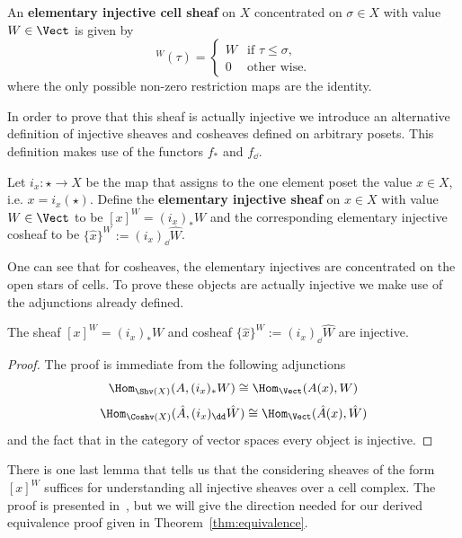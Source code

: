 \begin{defn}
 An \textbf{elementary injective cell sheaf} on $X$ concentrated on $\sigma\in X$ with value $W\in\Vect$ is given by
\begin{equation*}
[\sigma]^W(\tau)=
\begin{cases}
W & \text{if } \tau\leq \sigma,\\
0 & \text{other wise.}
\end{cases}
\end{equation*}
where the only possible non-zero restriction maps are the identity.
\end{defn}

In order to prove that this sheaf is actually injective we introduce an alternative definition of injective sheaves and cosheaves defined on arbitrary posets. This definition makes use of the functors $f_*$ and $f_{\dd}$.

\begin{defn}
 Let $i_x:\star \to X$ be the map that assigns to the one element poset the value $x\in X$, i.e. $x=i_x(\star)$. Define the \textbf{elementary injective sheaf} on $x\in X$ with value $W\in\Vect$ to be  $[x]^W=(i_x)_*W$ and the corresponding elementary injective cosheaf to be $\{\hat{x}\}^W:=(i_x)_{\dd}\hat{W}$. 
\end{defn} 

One can see that for cosheaves, the elementary injectives are concentrated on the open stars of cells. To prove these objects are actually injective we make use of the adjunctions already defined.

\begin{lem}
	The sheaf $[x]^W=(i_x)_*W$ and cosheaf $\{\hat{x}\}^W:=(i_x)_{\dd}\hat{W}$ are injective.
\end{lem}
\begin{proof}
	The proof is immediate from the following adjunctions
	\[
		\Hom_{\Shv(X)}(A,(i_x)_*W)\cong \Hom_{\Vect} (A(x),W)
	\]
	\[ 
		\Hom_{\Coshv(X)}(\hat{A},(i_x)_{\dd}\hat{W})\cong \Hom_{\Vect}(\hat{A}(x),\hat{W})
	\]
	and the fact that in the category of vector spaces every object is injective.
\end{proof} 

There is one last lemma that tells us that the considering sheaves of the form $[x]^W$ suffices for understanding all injective sheaves over a cell complex. The proof is presented in~\cite[Thm.~1.3.2, p.19-20]{shepard}, but we will give the direction needed for our derived equivalence proof given in Theorem~\ref{thm:equivalence}.

